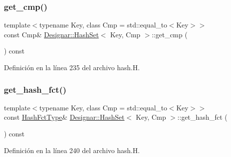 \mbox{\label{class_designar_1_1_hash_set_a7be703ea6ba171fc58ea5b5ffd8ffa6d}} 
\subsubsection{\texorpdfstring{get\+\_\+cmp()}{get\_cmp()}\hspace{0.1cm}{\footnotesize\ttfamily [2/2]}}
{\footnotesize\ttfamily template$<$typename Key, class Cmp = std\+::equal\+\_\+to$<$\+Key$>$$>$ \\
const Cmp\& \hyperlink{class_designar_1_1_hash_set}{Designar\+::\+Hash\+Set}$<$ Key, Cmp $>$\+::get\+\_\+cmp (\begin{DoxyParamCaption}{ }\end{DoxyParamCaption}) const\hspace{0.3cm}{\ttfamily [inline]}}



Definición en la línea 235 del archivo hash.\+H.

\mbox{\label{class_designar_1_1_hash_set_a4cc71f53416e8cde16b1f4a76d81c9ca}} 
\subsubsection{\texorpdfstring{get\+\_\+hash\+\_\+fct()}{get\_hash\_fct()}}
{\footnotesize\ttfamily template$<$typename Key, class Cmp = std\+::equal\+\_\+to$<$\+Key$>$$>$ \\
const \hyperlink{class_designar_1_1_hash_set_a05d8d111665c25bc17290c01fa299398}{Hash\+Fct\+Type}\& \hyperlink{class_designar_1_1_hash_set}{Designar\+::\+Hash\+Set}$<$ Key, Cmp $>$\+::get\+\_\+hash\+\_\+fct (\begin{DoxyParamCaption}{ }\end{DoxyParamCaption}) const\hspace{0.3cm}{\ttfamily [inline]}}



Definición en la línea 240 del archivo hash.\+H.

\mbox{\label{class_designar_1_1_hash_set_a5bb190c4e06ee28394adb03d51cc9607}} 
